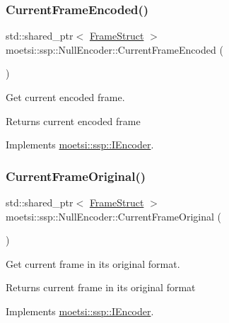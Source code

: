 \subsubsection{\texorpdfstring{Current\+Frame\+Encoded()}{CurrentFrameEncoded()}}
{\footnotesize\ttfamily std\+::shared\+\_\+ptr$<$ \hyperlink{structmoetsi_1_1ssp_1_1FrameStruct}{Frame\+Struct} $>$ moetsi\+::ssp\+::\+Null\+Encoder\+::\+Current\+Frame\+Encoded (\begin{DoxyParamCaption}{ }\end{DoxyParamCaption})\hspace{0.3cm}{\ttfamily [virtual]}}



Get current encoded frame. 

\begin{DoxyReturn}{Returns}
current encoded frame 
\end{DoxyReturn}


Implements \hyperlink{classmoetsi_1_1ssp_1_1IEncoder_a178d117518e7c7007414ea9c82bd3ed6}{moetsi\+::ssp\+::\+I\+Encoder}.

\mbox{\label{classmoetsi_1_1ssp_1_1NullEncoder_ad972dfdb93d2f609cdc885c53079ede2}} 
\subsubsection{\texorpdfstring{Current\+Frame\+Original()}{CurrentFrameOriginal()}}
{\footnotesize\ttfamily std\+::shared\+\_\+ptr$<$ \hyperlink{structmoetsi_1_1ssp_1_1FrameStruct}{Frame\+Struct} $>$ moetsi\+::ssp\+::\+Null\+Encoder\+::\+Current\+Frame\+Original (\begin{DoxyParamCaption}{ }\end{DoxyParamCaption})\hspace{0.3cm}{\ttfamily [virtual]}}



Get current frame in its original format. 

\begin{DoxyReturn}{Returns}
current frame in its original format 
\end{DoxyReturn}


Implements \hyperlink{classmoetsi_1_1ssp_1_1IEncoder_ab60bdaae0a85289dfa31a12bab533dc0}{moetsi\+::ssp\+::\+I\+Encoder}.

